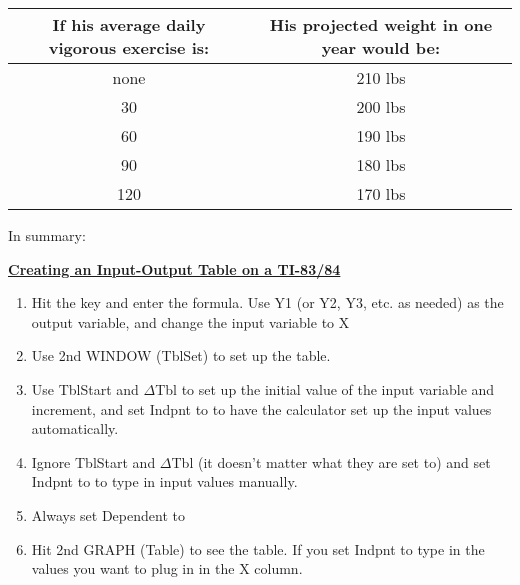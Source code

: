\begin{center}
	\begin{tabular}{|c|c|}
		\hline
		If his average daily vigorous exercise is: & His projected weight in one year would be:\\
		\hline
		none & 210 lbs\\
		\hline
		30 & 200 lbs\\
		\hline
		60 & 190 lbs\\
		\hline
		90 & 180 lbs\\
		\hline
		120 & 170 lbs\\
		\hline
	\end{tabular}
\end{center}

In summary:

%
%

\begin{definition}
	\textbf{\underline{Creating an Input-Output Table on a TI-83/84}}\\
	\bigskip
	\begin{enumerate}
		\item Hit the  key and enter the formula. Use Y1 (or Y2, Y3, etc. as needed) as the output variable, and change the input variable to X
		\item Use 2nd WINDOW (TblSet) to set up the table.
		\item Use TblStart and $\Delta$Tbl to set up the initial value of the input variable and increment, and set Indpnt to  to have the calculator set up the input values automatically.
		\item Ignore TblStart and $\Delta$Tbl (it doesn’t matter what they are set to) and set Indpnt to  to type in input values manually.
		\item Always set Dependent to 
		\item Hit 2nd GRAPH (Table) to see the table. If you set Indpnt to  type in the values you 	want to plug in in the X column.
	\end{enumerate}
\end{definition}


